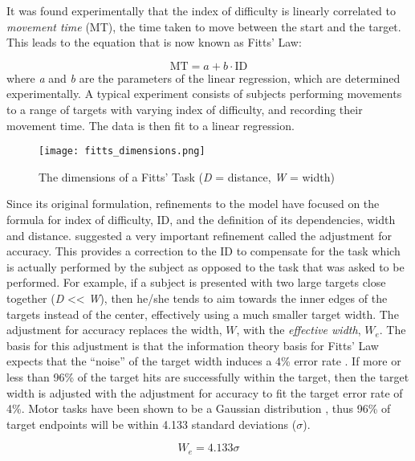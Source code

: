 It was found experimentally that the index of difficulty is linearly correlated to \emph{movement time} (MT), the time taken to move between the start and the target.
This leads to the equation that is now known as Fitts' Law:

\begin{equation}
    \mathrm{MT} = a + b \cdot \mathrm{ID}
\end{equation}
where \emph{a} and \emph{b} are the parameters of the linear regression, which are determined experimentally.
A typical experiment consists of subjects performing movements to a range of targets with varying index of difficulty, and recording their movement time.
The data is then fit to a linear regression.

\begin{figure}
    \centering
    \texttt{[image: fitts\_dimensions.png]}
    \caption{The dimensions of a Fitts' Task (\emph{D} = distance, \emph{W} = width)}
    \label{fig:intro_fitts}
\end{figure}

Since its original formulation, refinements to the model have focused on the formula for index of difficulty, \(\text{ID}\), and the definition of its dependencies, width and distance.
\citet{crossman_speed_1957} suggested a very important refinement called the adjustment for accuracy.
This provides a correction to the \(\text{ID}\) to compensate for the task which is actually performed by the subject as opposed to the task that was asked to be performed.
For example, if a subject is presented with two large targets close together (\emph{D} \textless{}\textless{} \emph{W}), then he/she tends to aim towards the inner edges of the targets instead of the center, effectively using a much smaller target width.
The adjustment for accuracy replaces the width, \(W\), with the \emph{effective width}, \(W_{e}\).
The basis for this adjustment is that the information theory basis for Fitts' Law expects that the ``noise'' of the target width induces a 4\% error rate \citep{mackenzie_fitts_1992}.
If more or less than 96\% of the target hits are successfully within the target, then the target width is adjusted with the adjustment for accuracy to fit the target error rate of 4\%.
Motor tasks have been shown to be a Gaussian distribution \citep{crossman_feedback_1983,woodworth_accuracy_1899}, thus 96\% of target endpoints will be within 4.133 standard deviations (\(\sigma\)).

\begin{equation}
W_{e} = 4.133\sigma
\end{equation}

